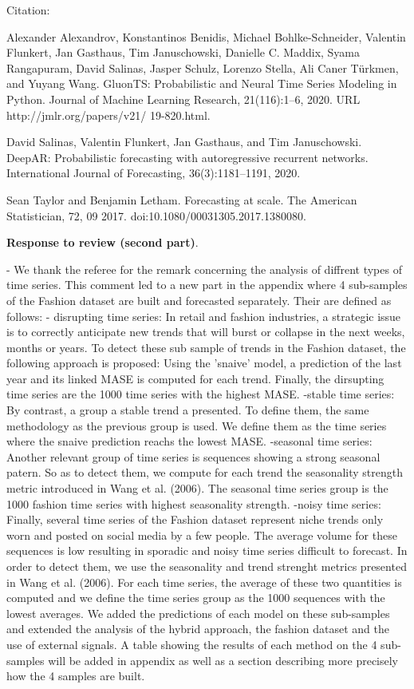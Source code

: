 \documentclass[10pt]{article} %
\begin{document}
Citation:

Alexander Alexandrov, Konstantinos Benidis, Michael Bohlke-Schneider, Valentin Flunkert, Jan Gasthaus, Tim Januschowski, Danielle C. Maddix, Syama Rangapuram, David Salinas, Jasper Schulz, Lorenzo Stella, Ali Caner Türkmen, and Yuyang Wang. GluonTS: Probabilistic and Neural Time Series Modeling in Python. Journal of Machine Learning Research, 21(116):1–6, 2020. URL http://jmlr.org/papers/v21/
19-820.html.

David Salinas, Valentin Flunkert, Jan Gasthaus, and Tim Januschowski. DeepAR: Probabilistic forecasting with autoregressive recurrent networks. International Journal of Forecasting, 36(3):1181–1191, 2020.

Sean Taylor and Benjamin Letham. Forecasting at scale. The American Statistician, 72, 09 2017. doi:10.1080/00031305.2017.1380080.


\textbf{Response to review (second part)}.\vspace{0.2cm}

	
- We thank the referee for the remark concerning the analysis of diffrent types of time series. This comment led to a new part in the appendix where 4 sub-samples of the Fashion dataset are built and forecasted separately.
Their are defined as follows:
	- disrupting time series: In retail and fashion industries, a strategic issue is to correctly anticipate new trends that will burst or collapse in the next weeks, months or years. To detect these sub sample of trends in the Fashion dataset, the following approach is proposed: Using the 'snaive' model, a prediction of the last year and its linked MASE is computed for each trend. Finally, the dirsupting time series are the 1000 time series with the highest MASE.
	-stable time series: By contrast, a group a stable trend a presented. To define them, the same methodology as the previous group is used. We define them as the time series where the snaive prediction reachs the lowest MASE. 
	-seasonal time series: Another relevant group of time series is sequences showing a strong seasonal patern. So as to detect them, we compute for each trend the seasonality strength metric introduced in Wang et al. (2006). The seasonal time series group is the 1000 fashion time series with highest seasonality strength.
	-noisy time series: Finally, several time series of the Fashion dataset represent niche trends only worn and posted on social media by a few people. The average volume for these sequences is low resulting in sporadic and noisy time series difficult to forecast. In order to detect them, we use the seasonality and trend strenght metrics presented in Wang et al. (2006). For each time series, the average of these two quantities is computed and we define the time series group as the 1000 sequences with the lowest averages.
We added the predictions of each model on these sub-samples and extended the analysis of the hybrid approach, the fashion dataset and the use of external signals. A table showing the results of each method on the 4 sub-samples will be added in appendix as well as a section describing more precisely how the 4 samples are built.
\end{document}
